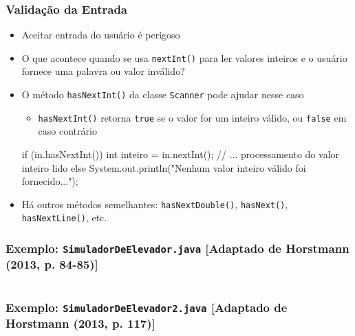\documentclass[xcolor={dvipsnames,table},aspectratio=169]{beamer}
\begin{document}
\begin{frame}[fragile]\frametitle{Validação da Entrada}
\begin{itemize}
	\item Aceitar entrada do usuário é perigoso
	\item O que acontece quando se usa \texttt{nextInt()} para ler valores inteiros e o usuário fornece uma palavra ou valor inválido?
	\item O método \texttt{hasNextInt()} da classe \texttt{Scanner} pode ajudar nesse caso
	\begin{itemize}
		\item \texttt{hasNextInt()} retorna \texttt{true} se o valor for um inteiro válido, ou \texttt{false} em caso contrário
	\end{itemize}
{\footnotesize
\begin{javacode}
if (in.hasNextInt()) {
  int inteiro = in.nextInt();
  // ... processamento do valor inteiro lido
}
else {
  System.out.println("Nenhum valor inteiro válido foi fornecido...");
}
\end{javacode}
}
	\item Há outros métodos semelhantes: \texttt{hasNextDouble()}, \texttt{hasNext()}, \texttt{hasNextLine()}, etc.
\end{itemize}
\end{frame}

\begin{frame}[fragile]\frametitle{Exemplo: \texttt{SimuladorDeElevador.java} {\tiny [Adaptado de Horstmann (2013, p. 84-85)]}}
\tiny{\inputminted[bgcolor=cyan!10]{java}{src/SimuladorDeElevador.java}}
\end{frame}

\begin{frame}[fragile]\frametitle{Exemplo: \texttt{SimuladorDeElevador2.java} {\tiny [Adaptado de Horstmann (2013, p. 117)]}}
\tiny{\inputminted[bgcolor=cyan!10]{java}{src/SimuladorDeElevador2.java}}
\end{frame}
\end{document}
